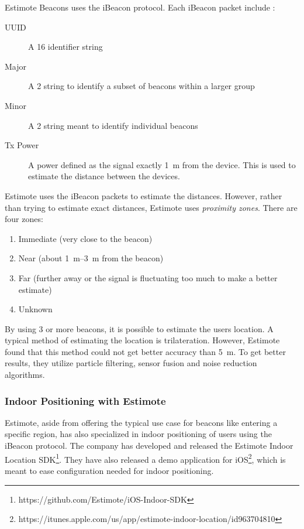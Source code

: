 Estimote Beacons uses the iBeacon protocol. 
Each iBeacon packet include \cite{IBEACON}:
\begin{description}
  \item[UUID] A \SI{16}{\byte} identifier string 
  \item[Major] A \SI{2}{\byte} string to identify a subset of beacons within a larger group
  \item[Minor] A \SI{2}{\byte} string meant to identify individual beacons
  \item[Tx Power] A power defined as the signal exactly \SI{1}{\meter} from the device. This is used to estimate the distance between the devices. 
\end{description}

Estimote uses the iBeacon packets to estimate the distances. 
However, rather than trying to estimate exact distances, 
Estimote uses \emph{proximity zones}. 
There are four zones:
\begin{enumerate}
  \item Immediate (very close to the beacon)
  \item Near (about \SIrange{1}{3}{\meter} from the beacon)
  \item Far (further away or the signal is fluctuating too much to make a better estimate)
  \item Unknown 
\end{enumerate}

By using \num{3} or more beacons, it is possible to estimate the users location. 
A typical method of estimating the location is trilateration. 
However, Estimote found that this method could not get better accuracy than \SI{5}{\meter}.
To get better results, 
they utilize particle filtering, sensor fusion and noise reduction algorithms.

\subsubsection{Indoor Positioning with Estimote}
Estimote, aside from offering the typical use case for beacons like entering a specific region, 
has also specialized in indoor positioning of users using the iBeacon protocol. 
The company has developed and released the Estimote Indoor Location SDK\footnote{https://github.com/Estimote/iOS-Indoor-SDK}.
They have also released a demo application for iOS\footnote{https://itunes.apple.com/us/app/estimote-indoor-location/id963704810}, 
which is meant to ease configuration needed for indoor positioning. 

